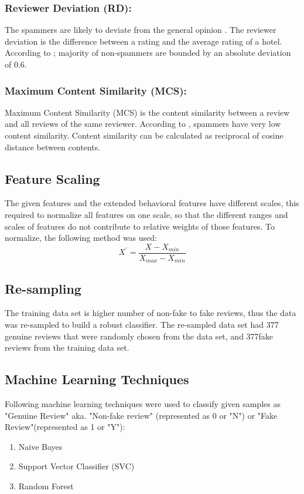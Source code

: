 \documentclass{llncs}
\begin{document}
\subsubsection{Reviewer Deviation (RD):}
%
The spammers are likely to deviate from the general opinion \cite{arjun:et}.  The  reviewer deviation is the difference between a rating and the average rating of a hotel. According to \cite{arjun:et}; majority of non-spammers are bounded by an absolute deviation of 0.6.
%
\subsubsection{Maximum Content Similarity (MCS):}
%
Maximum Content Similarity (MCS) is the content similarity between a review and all reviews of the same reviewer. According to \cite{arjun:et}, spammers have very low content similarity. Content similarity can be calculated as reciprocal of cosine distance between contents.
%

\subsection{Feature Scaling}
The given features and the extended behavioral features have different scales, this required to normalize all features on one scale, so that the different ranges and scales of features do not contribute to relative weights of those features. To normalize, the following method was used:
\[ X^{'} =\frac{X - X_{min}}{X_{max} - X_{min}}   \]

\subsection{Re-sampling}
The training data set is higher number of non-fake to fake reviews, thus the data was re-sampled to build a robust classifier. The re-sampled data set had 377 genuine reviews that were randomly chosen from the data set, and 377fake reviews from the training data set.

\subsection{Machine Learning Techniques}
Following machine learning techniques were used to classify given samples as "Genuine Review" aka. "Non-fake review" (represented as 0 or "N") or "Fake Review"(represented as 1 or "Y"):
\begin{enumerate}
   \item Naive Bayes
   \item Support Vector Classifier (SVC)
   \item Random Forest
 \end{enumerate}
 
\end{document}
